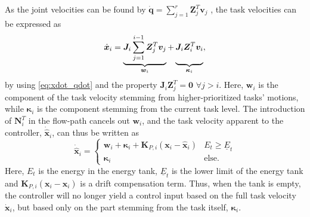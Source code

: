 \documentclass[../main.tex]{subfiles}
\begin{document}

As the joint velocities can be found by $\dot{\bm{q}}=\sum_{j=1}^{r} \bm{Z}_j^T\bm{v}_j$ \cite{ottPrioritizedMultiTaskCompliance2015}, the task velocities can be expressed as \cite{dietrichPassiveHierarchicalImpedance2017}
\begin{equation} \label{eq:xdot_kappa_w}
    \dot{\bm{x}}_i= \underbrace{\bm{J}_i\sum_{j=1}^{i-1}\bm{Z}_j^T\bm{v}_j}_{\bm{w}_i} +
    \underbrace{\vphantom{\sum_{j=1}^{i-1}}
        \bm{J}_i\bm{Z}_i^T\bm{v}_i}_{\bm{\kappa}_i},
\end{equation}
by using \eqref{eq:xdot_qdot} and the property $\bm{J}_i\bm{Z}^T_j = \bm{0}$ $\forall j>i$. 
Here, $\bm{w}_i$ is the component of the task velocity stemming from higher-prioritized tasks' motions, while $\bm{\kappa}_i$ is the component stemming from the current task level.
The introduction of $\bm{N}_i^T$ in the flow-path cancels out $\bm{w}_i$, and the task velocity apparent to the controller, $\dot{\hat{\bm{x}}}_i$, can thus be written as
\begin{equation} \label{eq:x_hat_dot}
    \dot{\hat{\bm{x}}}_i = \begin{cases}
        \bm{w}_i + \bm{\kappa}_i + \bm{K}_{P,i}(\bm{x}_i - \hat{\bm{x}}_i) & E_{t} \geq \underline{E}_t \\
        \bm{\kappa}_i & \text{else}.
    \end{cases}
\end{equation}
Here, $E_t$ is the energy in the energy tank, $\underline{E}_t$ is the lower limit of the energy tank and $\bm{K}_{P,i}(\bm{x}_i - \hat{\bm{x}}_i)$ is a drift compensation term.
Thus, when the tank is empty, the controller will no longer yield a control input based on the full task velocity $\dot{\bm{x}}_i$, but based only on the part stemming from the task itself, $\bm{\kappa}_i$. 
\end{document}
